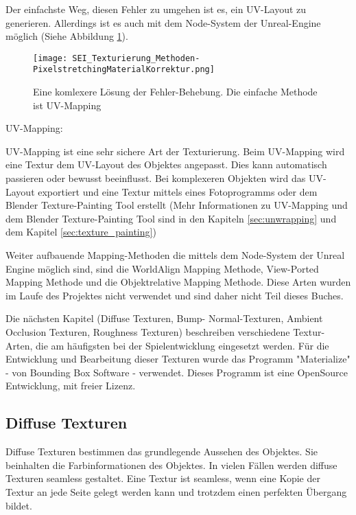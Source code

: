 Der einfachste Weg, diesen Fehler zu umgehen ist es, ein UV-Layout zu generieren. Allerdings ist es auch mit dem
Node-System der Unreal-Engine\citep{ue:node_introduction} möglich (Siehe Abbildung \ref{picture:tex_streching_solve}).


\begin{figure}[h]
    \centering
    \texttt{[image: SEI\_Texturierung\_Methoden-PixelstretchingMaterialKorrektur.png]}
    \caption{Eine komlexere Lösung der Fehler-Behebung. Die einfache Methode ist UV-Mapping}
    \label{picture:tex_streching_solve}
\end{figure}


UV-Mapping:

UV-Mapping ist eine sehr sichere Art der Texturierung. Beim UV-Mapping wird eine Textur dem UV-Layout des Objektes
angepasst. Dies kann automatisch passieren oder bewusst beeinflusst. Bei komplexeren Objekten wird das UV-Layout
exportiert und eine Textur mittels eines Fotoprogramms oder dem Blender Texture-Painting Tool erstellt
(Mehr Informationen zu UV-Mapping und dem Blender Texture-Painting Tool sind in den Kapiteln \ref{sec:unwrapping} und
dem Kapitel \ref{sec:texture_painting})


Weiter aufbauende Mapping-Methoden die mittels dem Node-System der Unreal Engine möglich sind, sind die WorldAlign
Mapping Methode, View-Ported Mapping Methode und die Objektrelative Mapping Methode. Diese Arten wurden im Laufe
des Projektes nicht verwendet und sind daher nicht Teil dieses Buches.

Die nächsten Kapitel (Diffuse Texturen, Bump- Normal-Texturen, Ambient Occlusion Texturen, Roughness Texturen)
beschreiben verschiedene Textur-Arten, die am häufigsten bei der Spielentwicklung eingesetzt werden. Für die
Entwicklung und Bearbeitung dieser Texturen wurde das Programm "Materialize" - von Bounding Box
Software\citep{bbs:materialize} - verwendet. Dieses Programm ist eine OpenSource Entwicklung, mit freier Lizenz.



\subsection{Diffuse Texturen}
\label{sec:tex_diffuse}

Diffuse Texturen\citep{blender:tex_introduction} bestimmen das grundlegende Aussehen des Objektes. Sie beinhalten die Farbinformationen des
Objektes.
In vielen Fällen werden diffuse Texturen seamless gestaltet. Eine Textur ist seamless, wenn eine Kopie der Textur an
jede Seite gelegt werden kann und trotzdem einen perfekten Übergang bildet.

